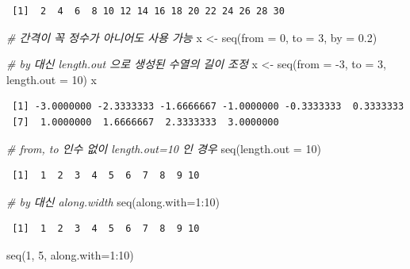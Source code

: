 \documentclass[
  11pt,
]{krantz}
\newenvironment{Shaded}{\begin{snugshade}}{\end{snugshade}}
\newcommand{\AttributeTok}[1]{\textcolor[rgb]{0.61,0.61,0.61}{#1}}
\newcommand{\CommentTok}[1]{\textcolor[rgb]{0.37,0.37,0.37}{\textit{#1}}}
\newcommand{\DecValTok}[1]{\textcolor[rgb]{0.06,0.06,0.06}{#1}}
\newcommand{\FloatTok}[1]{\textcolor[rgb]{0.06,0.06,0.06}{#1}}
\newcommand{\FunctionTok}[1]{\textcolor[rgb]{0,0,0}{#1}}
\newcommand{\NormalTok}[1]{#1}
\newcommand{\OtherTok}[1]{\textcolor[rgb]{0.37,0.37,0.37}{#1}}
\newcommand{\SpecialCharTok}[1]{\textcolor[rgb]{0,0,0}{#1}}
\begin{document}
\begin{verbatim}
 [1]  2  4  6  8 10 12 14 16 18 20 22 24 26 28 30
\end{verbatim}

\begin{Shaded}
\begin{Highlighting}[]
\CommentTok{\# 간격이 꼭 정수가 아니어도 사용 가능}
\NormalTok{x }\OtherTok{\textless{}{-}} \FunctionTok{seq}\NormalTok{(}\AttributeTok{from =} \DecValTok{0}\NormalTok{, }\AttributeTok{to =} \DecValTok{3}\NormalTok{, }\AttributeTok{by =} \FloatTok{0.2}\NormalTok{)}

\CommentTok{\# by 대신 length.out 으로 생성된 수열의 길이 조정}
\NormalTok{x }\OtherTok{\textless{}{-}} \FunctionTok{seq}\NormalTok{(}\AttributeTok{from =} \SpecialCharTok{{-}}\DecValTok{3}\NormalTok{, }\AttributeTok{to =} \DecValTok{3}\NormalTok{, }\AttributeTok{length.out =} \DecValTok{10}\NormalTok{)}
\NormalTok{x}
\end{Highlighting}
\end{Shaded}

\begin{verbatim}
 [1] -3.0000000 -2.3333333 -1.6666667 -1.0000000 -0.3333333  0.3333333
 [7]  1.0000000  1.6666667  2.3333333  3.0000000
\end{verbatim}

\begin{Shaded}
\begin{Highlighting}[]
\CommentTok{\# from, to 인수 없이 length.out=10 인 경우}
\FunctionTok{seq}\NormalTok{(}\AttributeTok{length.out =} \DecValTok{10}\NormalTok{)}
\end{Highlighting}
\end{Shaded}

\begin{verbatim}
 [1]  1  2  3  4  5  6  7  8  9 10
\end{verbatim}

\begin{Shaded}
\begin{Highlighting}[]
\CommentTok{\# by 대신 along.width }
\FunctionTok{seq}\NormalTok{(}\AttributeTok{along.with=}\DecValTok{1}\SpecialCharTok{:}\DecValTok{10}\NormalTok{)}
\end{Highlighting}
\end{Shaded}

\begin{verbatim}
 [1]  1  2  3  4  5  6  7  8  9 10
\end{verbatim}

\begin{Shaded}
\begin{Highlighting}[]
\FunctionTok{seq}\NormalTok{(}\DecValTok{1}\NormalTok{, }\DecValTok{5}\NormalTok{, }\AttributeTok{along.with=}\DecValTok{1}\SpecialCharTok{:}\DecValTok{10}\NormalTok{)}
\end{Highlighting}
\end{Shaded}
\end{document}
